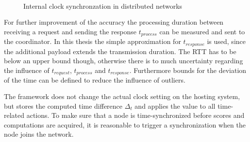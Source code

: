 \begin{figure}[!htb] %
	\centering
	\\
	\caption[Distributed clock synchronzation]{Internal clock synchronzation in distributed networks} \label{figure:Distributed clock synchronzation}
\end{figure}

For further improvement of the accuracy the processing duration between receiving a request and sending the response $t_{process}$ can be measured and sent to the coordinator. In this thesis the simple approximation for $t_{response}$ is used, since the additional payload extends the transmission duration. The \gls{RTT} has to be below an upper bound though, otherwise there is to much uncertainty regarding the influence of $t_{request}$, $t_{process}$ and $t_{response}$.
Furthermore bounds for the deviation of the time can be defined to reduce the influence of outliers.

The framework does not change the actual clock setting on the hosting system, but stores the computed time difference $\Delta_t$ and applies the value to all time-related actions. To make sure that a node is time-synchronized before scores and computations are acquired, it is reasonable to trigger a synchronization when the node joins the network. 

